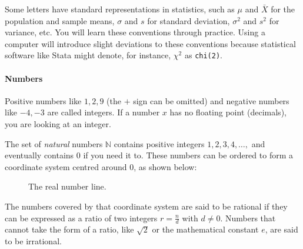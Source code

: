 

Some letters have standard representations in statistics, such as $\mu$ and $\bar X$ for the population and sample means, $\sigma$ and $s$ for standard deviation, $\sigma^2$ and $s^2$ for variance, etc. You will learn these conventions through practice. Using a computer will introduce slight deviations to these conventions because statistical software like Stata might denote, for instance, $\chi^2$ as \texttt{chi(2)}.

%
\paragraph{Numbers}%
%
Positive numbers like $1, 2, 9$ (the $+$ sign can be omitted) and negative numbers like $-4, -3$ are called integers. If a number $x$ has no floating point (decimals), you are looking at an integer.

The set of \emph{natural} numbers $\mathbb{N}$ contains positive integers $1,2,3,4, \ldots, $ and eventually contains $0$ if you need it to. These numbers can be ordered to form a coordinate system centred around $0$, as shown below:

\begin{figure}[h]
  \caption{The real number line.}
\end{figure}

The numbers covered by that coordinate system are said to be rational if they can be expressed as a ratio of two integers $r = \frac{n}{d}$ with $d \neq 0$. Numbers that cannot take the form of a ratio, like $\sqrt{2}$ or the mathematical constant $e$, are said to be irrational.

